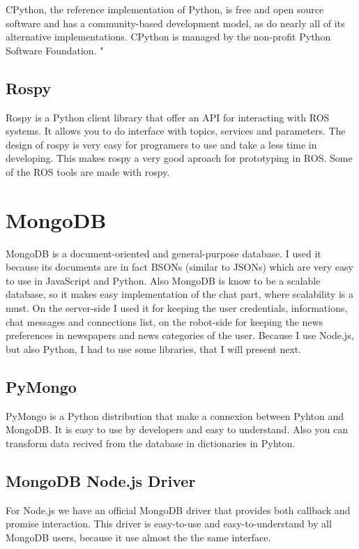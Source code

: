 CPython, the reference implementation of Python, is free and open source software and has a community-based
development model, as do nearly all of its alternative implementations. CPython is managed by the non-profit Python
Software Foundation.
" \cite{van2007python}
\subsection{Rospy}
\label{sub-sec:python-rospy}
Rospy is a Python client library that offer an API for interacting with ROS systems.
It allows you to do interface with topics, services and parameters. The design of rospy
is very easy for programers to use and take a less time in developing. This makes rospy
a very good aproach for prototyping in ROS. Some of the ROS tools are made with rospy.


\section{MongoDB}
\label{sec:mongo}
MongoDB \cite{chodorow2013mongodb} is a document-oriented and general-purpose database. I used it because
its documents are in fact BSONs (similar to JSONs) which are very easy to use in JavaScript and Python.
Also MongoDB is know to be a scalable database, so it makes easy implementation of
the chat part, where scalability is a must. On the server-side I used it for keeping
the user credentials, informations, chat messages and connections list, on the robot-side
for keeping the news preferences in newspapers and news categories of the user. Because I use Node.js,
but also Python, I had to use some libraries, that I will present next.
\subsection{PyMongo}
\label{sub-sec:mongo-py}
PyMongo is a Python distribution that make a connexion between Pyhton and MongoDB. It is easy to use by
developers and easy to understand. Also you can transform data recived from the database in dictionaries
in Pyhton.
\subsection{MongoDB Node.js Driver}
\label{sub-sec:mongo-node}
For Node.js we have an official MongoDB driver that provides both callback and promise interaction.
This driver is easy-to-use and easy-to-understand by all MongoDB users, because it use almost the
the same interface.
